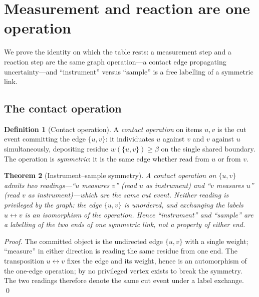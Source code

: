 \documentclass[11pt,a4paper]{article}
\theoremstyle{thmstyle}
\newtheorem{theorem}{Theorem}[section]
\theoremstyle{definition}
\newtheorem{definition}[theorem]{Definition}
\theoremstyle{remark}
\newcommand{\wt}{w}
\newcommand{\flo}{\beta}                 %
\begin{document}
\section{Measurement and reaction are one operation}
\label{sec:contact-symmetry}

We prove the identity on which the table rests: a measurement step and a
reaction step are the same graph operation---a contact edge propagating
uncertainty---and ``instrument'' versus ``sample'' is a free labelling of a
symmetric link.

\subsection{The contact operation}

\begin{definition}[Contact operation]
\label{def:contact-op}
A \emph{contact operation} on items $u,v$ is the cut event committing the
edge $\{u,v\}$: it individuates $u$ against $v$ and $v$ against $u$
simultaneously, depositing residue $\wt(\{u,v\})\ge\flo$ on the single
shared boundary. The operation is \emph{symmetric}: it is the same edge
whether read from $u$ or from $v$.
\end{definition}

\begin{theorem}[Instrument--sample symmetry]
\label{thm:symmetry}
A contact operation on $\{u,v\}$ admits two readings---``$u$ measures $v$''
(read $u$ as instrument) and ``$v$ measures $u$'' (read $v$ as
instrument)---which are the same cut event. Neither reading is privileged
by the graph: the edge $\{u,v\}$ is unordered, and exchanging the labels
$u\leftrightarrow v$ is an isomorphism of the operation. Hence
``instrument'' and ``sample'' are a labelling of the two ends of one
symmetric link, not a property of either end.
\end{theorem}

\begin{proof}
The committed object is the undirected edge $\{u,v\}$ with a single weight;
``measure'' in either direction is reading the same residue from one end.
The transposition $u\leftrightarrow v$ fixes the edge and its weight, hence
is an automorphism of the one-edge operation; by  no
privileged vertex exists to break the symmetry. The two readings therefore
denote the same cut event under a label exchange. \qed
\end{proof}
\end{document}
